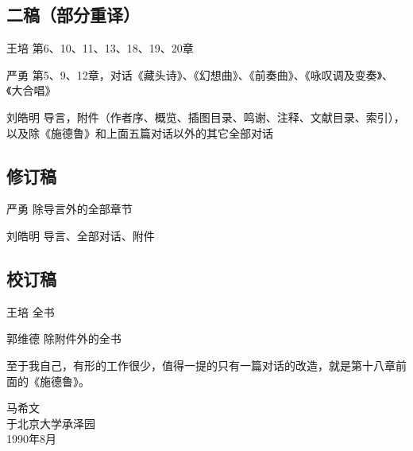\subsection*{二稿（部分重译）}

\begin{authorlist}
\item[王培]第6、10、11、13、18、19、20章
\item[严勇]第5、9、12章，对话《藏头诗》、《幻想曲》、《前奏曲》、《咏叹调及变奏》、《大合唱》
\item[刘皓明]导言，附件（作者序、概览、插图目录、鸣谢、注释、文献目录、索引），以及除《施德鲁》和上面五篇对话以外的其它全部对话
\end{authorlist}

\subsection*{修订稿}

\begin{authorlist}
\item[严勇]除导言外的全部章节
\item[刘皓明]导言、全部对话、附件
\end{authorlist}

\subsection*{校订稿}

\begin{authorlist}
\item[王培]全书
\item[郭维德]除附件外的全书
\end{authorlist}

至于我自己，有形的工作很少，值得一提的只有一篇对话的改造，就是第十八章前面的《施德鲁》。

\begin{signature}
马希文\\
于北京大学承泽园\\
\small 1990年8月\\
\end{signature}
